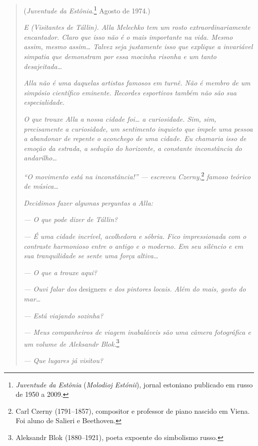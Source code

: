 \begin{quotation}
\begin{flushright}
(\emph{Juventude da Estônia}.\footnote{\emph{Juventude da Estônia}
  (\emph{Molodioj Estónii}), jornal estoniano publicado em russo de 1950
  a 2009.} Agosto de 1974.)
\end{flushright}
\vspace{4pt}
\noindent\emph{E (Visitantes de Tállin). Alla Melechko tem um
rosto extraordinariamente encantador. Claro que isso não é o mais
importante na vida. Mesmo assim, mesmo assim\ldots{} Talvez seja justamente
isso que explique a invariável simpatia que demonstram por essa mocinha
risonha e um tanto desajeitada\ldots{}}

\emph{Alla não é uma daquelas artistas famosos em turnê. Não é membro de
um simpósio científico eminente. Recordes esportivos também não são sua
especialidade.}

\emph{O que trouxe Alla a nossa cidade foi\ldots{} a curiosidade. Sim, sim,
precisamente a curiosidade, um sentimento inquieto que impele uma pessoa
a abandonar de repente o aconchego de uma cidade. Eu chamaria isso de
emoção da estrada, a sedução do horizonte, a constante inconstância do
andarilho\ldots{}}

\emph{``O movimento está na inconstância!'' --- escreveu
Czerny,}\footnote{Carl Czerny (1791--1857), compositor e professor de
  piano nascido em Viena. Foi aluno de Salieri e Beethoven.}
\emph{famoso teórico de música\ldots{}}

\emph{Decidimos fazer algumas perguntas a Alla:}

\emph{--- O que pode dizer de Tállin?}

\emph{--- É uma cidade incrível, acolhedora e sóbria. Fico impressionada
com o contraste harmonioso entre o antigo e o moderno. Em seu silêncio e
em sua tranquilidade se sente uma força altiva\ldots{}}

\emph{--- O que a trouxe aqui?}

\emph{--- Ouvi falar dos} designers \emph{e dos pintores locais. Além do
mais, gosto do mar\ldots{}}

\emph{--- Está viajando sozinha?}

\emph{--- Meus companheiros de viagem inabaláveis são uma câmera
fotográfica e um volume de Aleksandr Blok.}\footnote{Aleksandr Blok
  (1880--1921), poeta expoente do simbolismo russo.}

\emph{--- Que lugares já visitou?}


\end{quotation}
